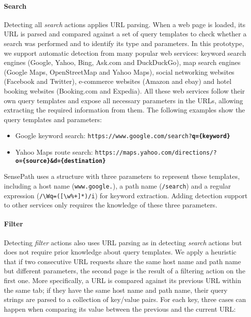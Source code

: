 \paragraph{Search}
Detecting all \emph{search} actions applies URL parsing. When a web page is loaded, its URL is parsed and compared against a set of query templates to check whether a search was performed and to identify its type and parameters. In this prototype, we support automatic detection from many popular web services: keyword search engines (Google, Yahoo, Bing, Ask.com and DuckDuckGo), map search engines (Google Maps, OpenStreetMap and Yahoo Maps), social networking websites (Facebook and Twitter), e-commerce websites (Amazon and ebay) and hotel booking websites (Booking.com and Expedia). All these web services follow their own query templates and expose all necessary parameters in the URLs, allowing extracting the required information from them. The following examples show the query templates and parameters:

\begin{itemize}
	\item Google keyword search: \texttt{https://www.google.com/search?\textbf{q=\{keyword\}}}
	\item Yahoo Maps route search: \texttt{https://maps.yahoo.com/directions/?\\\textbf{o=\{source\}\&d=\{destination\}}}
\end{itemize}

SensePath uses a structure with three parameters to represent these templates, including a host name (\texttt{www.google.}), a path name (\texttt{/search}) and a regular expression (\verb|/\Wq=([\w%+]*)/i|) for keyword extraction. Adding detection support to other services only requires the knowledge of these three parameters.

\paragraph{Filter}
Detecting \emph{filter} actions also uses URL parsing as in detecting \emph{search} actions but does not require prior knowledge about query templates. We apply a heuristic that if two consecutive URL requests share the same host name and path name but different parameters, the second page is the result of a filtering action on the first one. More specifically, a URL is compared against its previous URL within the same tab; if they have the same host name and path name, their query strings are parsed to a collection of key/value pairs. For each key, three cases can happen when comparing its value between the previous and the current URL:

